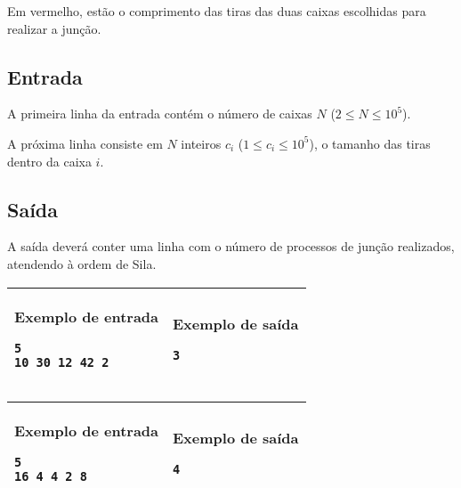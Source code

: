 Em vermelho, estão o comprimento das tiras das duas caixas escolhidas para realizar a junção.

\subsection*{Entrada}
 
A primeira linha da entrada contém o número de caixas $N$ ($2\leq N\leq 10^5$).
 
A próxima linha consiste em $N$ inteiros $c_i$ ($1\leq c_i \leq 10^5$), o tamanho das tiras dentro da caixa $i$.
 
\subsection*{Saída}
A saída deverá conter uma linha com o número de processos de junção realizados, atendendo à ordem de Sila.

\newpage
\begin{table}[!h]
\centering
\begin{tabular}{|l|l|}
\hline
\begin{minipage}[t]{3in}
\textbf{Exemplo de entrada}
\begin{verbatim}
5
10 30 12 42 2
\end{verbatim}
\vspace{1mm}
\end{minipage}
&
\begin{minipage}[t]{3in}
\textbf{Exemplo de saída}
\begin{verbatim}
3
\end{verbatim}
\vspace{1mm}
\end{minipage} \\
\hline
\end{tabular}
\end{table}

\begin{table}[!h]
\centering
\begin{tabular}{|l|l|}
\hline
\begin{minipage}[t]{3in}
\textbf{Exemplo de entrada}
\begin{verbatim}
5
16 4 4 2 8
\end{verbatim}
\vspace{1mm}
\end{minipage}
&
\begin{minipage}[t]{3in}
\textbf{Exemplo de saída}
\begin{verbatim}
4
\end{verbatim}
\vspace{1mm}
\end{minipage} \\
\hline
\end{tabular}
\end{table}

